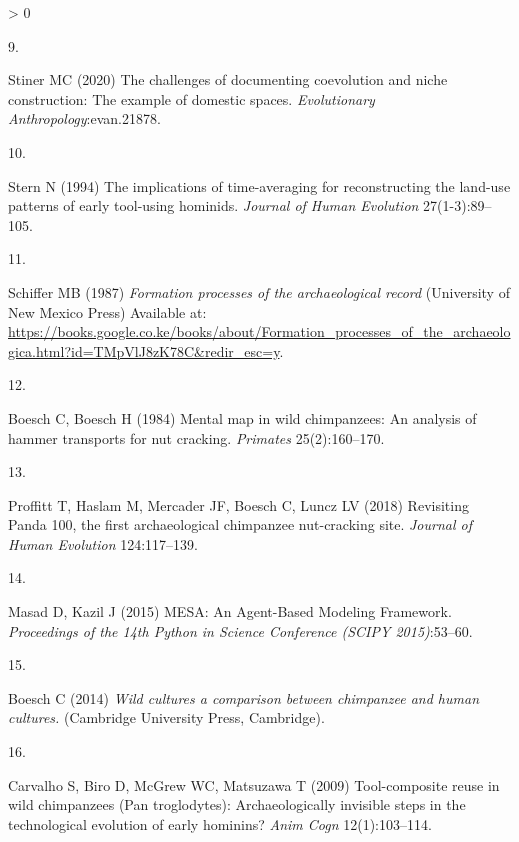 \documentclass[9pt,twocolumn,twoside,]{pnas-new}
\newlength{\csllabelwidth}
\newlength{\cslhangindent}
\newenvironment{CSLReferences}[3] %
 {%
  \setlength{\parindent}{0pt}
  \ifodd #1 \everypar{\setlength{\hangindent}{\cslhangindent}}\ignorespaces\fi
  \ifnum #2 > 0
  \setlength{\parskip}{#2\baselineskip}
  \fi
 }%
 {}
\newcommand{\CSLLeftMargin}[1]{\parbox[t]{\csllabelwidth}{#1}}
\newcommand{\CSLRightInline}[1]{\parbox[t]{\linewidth - \csllabelwidth}{#1}}
\begin{document}
\begin{CSLReferences}{0}{0}
\leavevmode\hypertarget{ref-stinerChallengesDocumentingCoevolution2020}{}%
\CSLLeftMargin{9. }
\CSLRightInline{Stiner MC (2020) The challenges of documenting
coevolution and niche construction: {The} example of domestic spaces.
\emph{Evolutionary Anthropology}:evan.21878.}

\leavevmode\hypertarget{ref-sternImplicationsTimeaveragingReconstructing1994}{}%
\CSLLeftMargin{10. }
\CSLRightInline{Stern N (1994) The implications of time-averaging for
reconstructing the land-use patterns of early tool-using hominids.
\emph{Journal of Human Evolution} 27(1-3):89--105.}

\leavevmode\hypertarget{ref-schifferFormationProcessesArchaeological1987}{}%
\CSLLeftMargin{11. }
\CSLRightInline{Schiffer MB (1987) \emph{Formation processes of the
archaeological record} ({University of New Mexico Press}) Available at:
\url{https://books.google.co.ke/books/about/Formation_processes_of_the_archaeologica.html?id=TMpVlJ8zK78C\&redir_esc=y}.}

\leavevmode\hypertarget{ref-boeschMentalMapWild1984}{}%
\CSLLeftMargin{12. }
\CSLRightInline{Boesch C, Boesch H (1984) Mental map in wild
chimpanzees: {An} analysis of hammer transports for nut cracking.
\emph{Primates} 25(2):160--170.}

\leavevmode\hypertarget{ref-proffittRevisitingPanda1002018}{}%
\CSLLeftMargin{13. }
\CSLRightInline{Proffitt T, Haslam M, Mercader JF, Boesch C, Luncz LV
(2018) Revisiting {Panda} 100, the first archaeological chimpanzee
nut-cracking site. \emph{Journal of Human Evolution} 124:117--139.}

\leavevmode\hypertarget{ref-masadMESAAgentBasedModeling2015}{}%
\CSLLeftMargin{14. }
\CSLRightInline{Masad D, Kazil J (2015) {MESA}: {An Agent}-{Based
Modeling Framework}. \emph{Proceedings of the 14th Python in Science
Conference (SCIPY 2015)}:53--60.}

\leavevmode\hypertarget{ref-boeschWildCulturesComparison2014}{}%
\CSLLeftMargin{15. }
\CSLRightInline{Boesch C (2014) \emph{Wild cultures a comparison between
chimpanzee and human cultures.} ({Cambridge University Press},
{Cambridge}).}

\leavevmode\hypertarget{ref-carvalhoToolcompositeReuseWild2009}{}%
\CSLLeftMargin{16. }
\CSLRightInline{Carvalho S, Biro D, McGrew WC, Matsuzawa T (2009)
Tool-composite reuse in wild chimpanzees ({Pan} troglodytes):
Archaeologically invisible steps in the technological evolution of early
hominins? \emph{Anim Cogn} 12(1):103--114.}


\end{CSLReferences}
\end{document}
